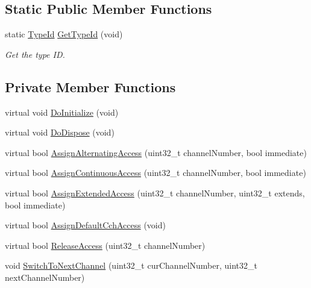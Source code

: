 \subsection*{Static Public Member Functions}
\begin{DoxyCompactItemize}
\item 
static \hyperlink{classns3_1_1TypeId}{Type\+Id} \hyperlink{classns3_1_1DefaultChannelScheduler_a010ff470f8de4c0b2f6c418e413689fa}{Get\+Type\+Id} (void)
\begin{DoxyCompactList}\small\item\em Get the type ID. \end{DoxyCompactList}\end{DoxyCompactItemize}
\subsection*{Private Member Functions}
\begin{DoxyCompactItemize}
\item 
virtual void \hyperlink{classns3_1_1DefaultChannelScheduler_a23adf09d454c17145603c769c4e50b86}{Do\+Initialize} (void)
\item 
virtual void \hyperlink{classns3_1_1DefaultChannelScheduler_a3f03555954b3895a69f39394cb37f251}{Do\+Dispose} (void)
\item 
virtual bool \hyperlink{classns3_1_1DefaultChannelScheduler_a8de51ae89df5a36d8a71f921d87b39ca}{Assign\+Alternating\+Access} (uint32\+\_\+t channel\+Number, bool immediate)
\item 
virtual bool \hyperlink{classns3_1_1DefaultChannelScheduler_aa693aed997fedf77fdbbb70ba862f887}{Assign\+Continuous\+Access} (uint32\+\_\+t channel\+Number, bool immediate)
\item 
virtual bool \hyperlink{classns3_1_1DefaultChannelScheduler_ac04d88e86b56d56681145dfb16b7cbeb}{Assign\+Extended\+Access} (uint32\+\_\+t channel\+Number, uint32\+\_\+t extends, bool immediate)
\item 
virtual bool \hyperlink{classns3_1_1DefaultChannelScheduler_a04e74683a8fce5f193b3c1f948c73bb9}{Assign\+Default\+Cch\+Access} (void)
\item 
virtual bool \hyperlink{classns3_1_1DefaultChannelScheduler_af9ec39655871dbbc5f07bfe5f326ec53}{Release\+Access} (uint32\+\_\+t channel\+Number)
\item 
void \hyperlink{classns3_1_1DefaultChannelScheduler_a661fb5bfff90527fa4be59820ccf8bdf}{Switch\+To\+Next\+Channel} (uint32\+\_\+t cur\+Channel\+Number, uint32\+\_\+t next\+Channel\+Number)
\end{DoxyCompactItemize}
